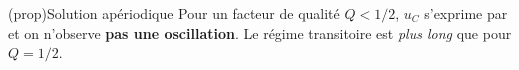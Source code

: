 \documentclass[../../main/main.tex]{subfiles}
\begin{document}
\begin{tcb*}[label=prop:solupseudoper, sidebyside, righthand ratio=.3]
	(prop){Solution apériodique}
	Pour un facteur de qualité $Q < 1/2$, $u_C$ s'exprime par
	\psw{%
		\[
			\boxed{
				u_C(t) =
				\frac{QE}{\w_0 \sqrt{1-4Q^2}}
				\left( r_+\exp(r_-t) - r_-\exp(r_+t) \right)
			}%
		\]
	}%
	et on n'observe \textbf{pas une oscillation}. Le régime transitoire est
	\textit{plus long} que pour $Q = 1/2$.
	\tcblower
	\begin{center}
		\vspace{-15pt}
	\end{center}
\end{tcb*}
\end{document}
